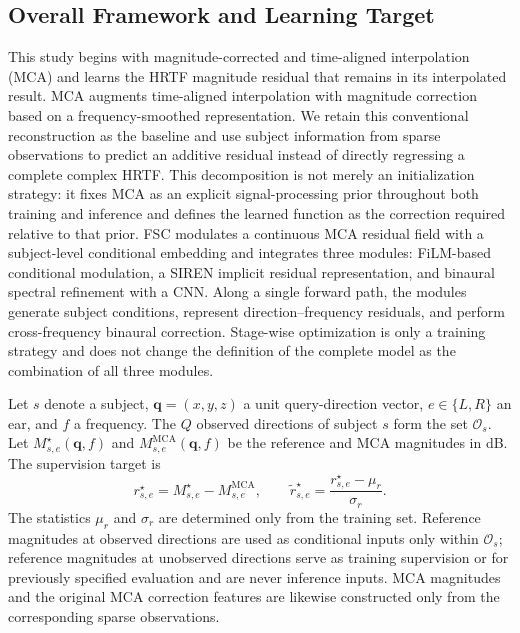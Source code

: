 \documentclass[UTF8,a4paper]{article}
\begin{document}
\subsection{Overall Framework and Learning Target}

This study begins with magnitude-corrected and time-aligned interpolation (MCA) and learns the HRTF magnitude residual that remains in its interpolated result. MCA augments time-aligned interpolation with magnitude correction based on a frequency-smoothed representation\cite{R1}. We retain this conventional reconstruction as the baseline and use subject information from sparse observations to predict an additive residual instead of directly regressing a complete complex HRTF. This decomposition is not merely an initialization strategy: it fixes MCA as an explicit signal-processing prior throughout both training and inference and defines the learned function as the correction required relative to that prior. FSC modulates a continuous MCA residual field with a subject-level conditional embedding and integrates three modules: FiLM-based conditional modulation, a SIREN implicit residual representation, and binaural spectral refinement with a CNN. Along a single forward path, the modules generate subject conditions, represent direction--frequency residuals, and perform cross-frequency binaural correction. Stage-wise optimization is only a training strategy and does not change the definition of the complete model as the combination of all three modules.

Let $s$ denote a subject, $\mathbf q=(x,y,z)$ a unit query-direction vector, $e\in\{L,R\}$ an ear, and $f$ a frequency. The $Q$ observed directions of subject $s$ form the set $\mathcal O_s$. Let $M^\star_{s,e}(\mathbf q,f)$ and $M^{\mathrm{MCA}}_{s,e}(\mathbf q,f)$ be the reference and MCA magnitudes in dB. The supervision target is
\begin{equation}
r^\star_{s,e}=M^\star_{s,e}-M^{\mathrm{MCA}}_{s,e},\qquad
\widetilde r^\star_{s,e}=\frac{r^\star_{s,e}-\mu_r}{\sigma_r}.
\label{eq:residual-target}
\end{equation}
The statistics $\mu_r$ and $\sigma_r$ are determined only from the training set. Reference magnitudes at observed directions are used as conditional inputs only within $\mathcal O_s$; reference magnitudes at unobserved directions serve as training supervision or for previously specified evaluation and are never inference inputs. MCA magnitudes and the original MCA correction features are likewise constructed only from the corresponding sparse observations.
\end{document}
